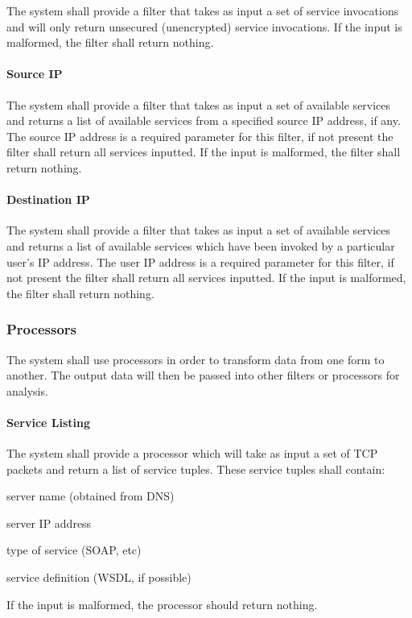 \documentclass[titlepage]{article}
\begin{document}
The system shall provide a filter that takes as input a set of service
invocations and will only return unsecured (unencrypted) service invocations.
If the input is malformed, the filter shall return nothing.

\paragraph{Source IP}

The system shall provide a filter that takes as input a set of available
services and returns a list of available services from a specified source IP
address, if any.  The source IP address is a required parameter for this
filter, if not present the filter shall return all services inputted.  If the
input is malformed, the filter shall return nothing.

\paragraph{Destination IP}

The system shall provide a filter that takes as input a set of available
services and returns a list of available services which have been invoked by a
particular user's IP address.  The user IP address is a required parameter for
this filter, if not present the filter shall return all services inputted.  If
the input is malformed, the filter shall return nothing.


\subsubsection{Processors}

The system shall use processors in order to transform data from one
form to another.  The output data will then be passed into other filters or
processors for analysis.

\paragraph{Service Listing}

The system shall provide a processor which will take as input a set of TCP
packets and return a list of service tuples.  These service tuples shall
contain:
\begin{itemize*}
    \item server name (obtained from DNS)
    \item server IP address
    \item type of service (SOAP, etc)
    \item service definition (WSDL, if possible)
\end{itemize*}
If the input is malformed, the processor should return nothing.
\end{document}
